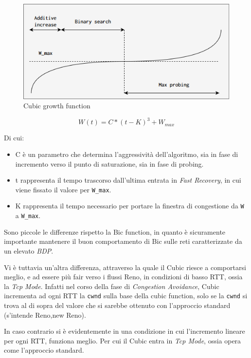\begin{figure} [H]

\center
\caption{Cubic growth function}
\includegraphics[scale=0.8]{chapters/A_cubic/img/cubic_growth_function.png}

\end{figure}

\[
W(t) = C*(t-K)^{3} + W_{max}
\]

Di cui:

\begin{itemize}

\item C è un parametro che determina l'aggressività dell'algoritmo, sia in fase di incremento verso il punto di saturazione, sia in fase di probing. 

\item t rappresenta il tempo trascorso dall'ultima entrata in \textit{Fast Recovery}, in cui viene fissato il valore per \texttt{W\_max}.

\item K rappresenta il tempo necessario per portare la finestra di congestione da \texttt{W} a \texttt{W\_max}.

\end{itemize}

Sono piccole le differenze rispetto la Bic function, in quanto è sicuramente importante mantenere il buon comportamento di Bic sulle reti caratterizzate da un elevato \textit{BDP}. \bigskip

Vi è tuttavia un'altra differenza, attraverso la quale il Cubic riesce a comportarsi meglio, e ad essere più fair verso i flussi Reno, in condizioni di basso RTT, ossia la \textit{Tcp Mode}.
Infatti nel corso della fase di \textit{Congestion Avoidance}, Cubic incrementa ad ogni RTT la \texttt{cwnd} sulla base della cubic function, solo se la \texttt{cwnd} si trova al di sopra del valore che si sarebbe ottenuto con l'approccio standard (s'intende Reno,new Reno). \bigskip

In caso contrario si è evidentemente in una condizione in cui l'incremento lineare per ogni RTT, funziona meglio. Per cui il Cubic entra in \textit{Tcp Mode}, ossia opera come l'approccio standard.